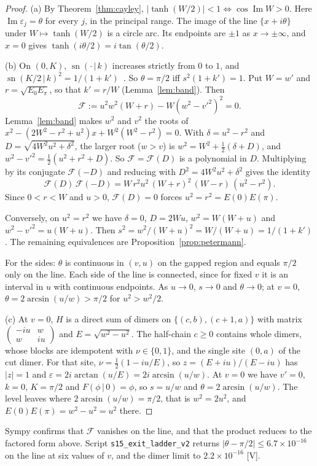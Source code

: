 \documentclass[11pt]{article}
\theoremstyle{definition}
\newcommand{\grade}[1]{\textsf{\small[#1]}}
\newcommand{\Ima}{\operatorname{Im}}
\newcommand{\sn}{\operatorname{sn}}
\begin{document}
\begin{proof}
(a) By Theorem~\ref{thm:cayley}, $|\tanh(W/2)|<1\iff\cos\Ima W>0$. Here $\Ima\varepsilon_j=\theta$ for every $j$, in the principal range. The image of the line $\{x+i\theta\}$ under $W\mapsto\tanh(W/2)$ is a circle arc. Its endpoints are $\pm1$ as $x\to\pm\infty$, and $x=0$ gives $\tanh(i\theta/2)=i\tan(\theta/2)$.

(b) On $(0,K)$, $\sn(\cdot\,|\,k)$ increases strictly from $0$ to $1$, and $\sn(K/2\,|\,k)^2=1/(1+k')$~\cite{byrd}. So $\theta=\pi/2$ iff $s^2(1+k')=1$. Put $W=w'$ and $r=\sqrt{E_0E_\pi}$, so that $k'=r/W$ (Lemma~\ref{lem:band}). Then
\[
\mathcal F:=u^2w^2(W+r)-W(w^2-v'^2)^2=0.
\]
Lemma~\ref{lem:band} makes $w^2$ and $v^2$ the roots of $x^2-(2W^2-r^2+u^2)x+W^2(W^2-r^2)=0$. With $\delta=u^2-r^2$ and $D=\sqrt{4W^2u^2+\delta^2}$, the larger root ($w>v$) is $w^2=W^2+\tfrac12(\delta+D)$, and $w^2-v'^2=\tfrac12(u^2+r^2+D)$. So $\mathcal F=\mathcal F(D)$ is a polynomial in $D$. Multiplying by its conjugate $\mathcal F(-D)$ and reducing with $D^2=4W^2u^2+\delta^2$ gives the identity
\[
\mathcal F(D)\,\mathcal F(-D)=W\,r^2u^2\,(W+r)^2\,(W-r)\,(u^2-r^2).
\]
Since $0<r<W$ and $u>0$, $\mathcal F(D)=0$ forces $u^2=r^2=E(0)E(\pi)$.

Conversely, on $u^2=r^2$ we have $\delta=0$, $D=2Wu$, $w^2=W(W+u)$ and $w^2-v'^2=u(W+u)$. Then $s^2=w^2/(W+u)^2=W/(W+u)=1/(1+k')$. The remaining equivalences are Proposition~\ref{prop:petermann}.

For the sides: $\theta$ is continuous in $(v,u)$ on the gapped region and equals $\pi/2$ only on the line. Each side of the line is connected, since for fixed $v$ it is an interval in $u$ with continuous endpoints. As $u\to0$, $s\to0$ and $\theta\to0$; at $v=0$, $\theta=2\arcsin(u/w)>\pi/2$ for $u^2>w^2/2$.

(c) At $v=0$, $H$ is a direct sum of dimers on $\{(c,b),(c+1,a)\}$ with matrix $\begin{pmatrix}-iu&w\\w&iu\end{pmatrix}$ and $E=\sqrt{w^2-u^2}$. The half-chain $c\ge0$ contains whole dimers, whose blocks are idempotent with $\nu\in\{0,1\}$, and the single site $(0,a)$ of the cut dimer. For that site, $\nu=\tfrac12(1-iu/E)$, so $z=(E+iu)/(E-iu)$ has $|z|=1$ and $\varepsilon=2i\arctan(u/E)=2i\arcsin(u/w)$. At $v=0$ we have $v'=0$, $k=0$, $K=\pi/2$ and $F(\phi\,|\,0)=\phi$, so $s=u/w$ and $\theta=2\arcsin(u/w)$. The level leaves where $2\arcsin(u/w)=\pi/2$, that is $w^2=2u^2$, and $E(0)E(\pi)=w^2-u^2=u^2$ there.
\end{proof}
Sympy confirms that $\mathcal F$ vanishes on the line, and that the product reduces to the factored form above. Script \texttt{s15\_exit\_ladder\_v2} returns $|\theta-\pi/2|\le6.7\times10^{-16}$ on the line at six values of $v$, and the dimer limit to $2.2\times10^{-16}$ \grade{V}.
\end{document}
